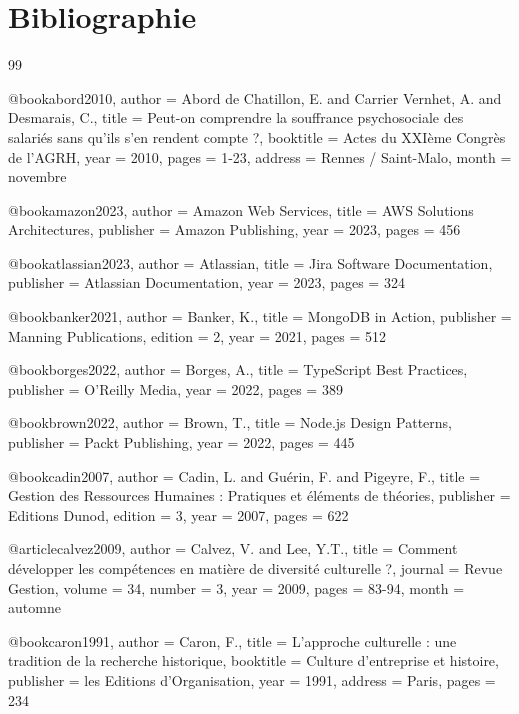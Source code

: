 \chapter*{Bibliographie}

\begin{thebibliography}{99}

@book{abord2010,
  author = {Abord de Chatillon, E. and Carrier Vernhet, A. and Desmarais, C.},
  title = {Peut-on comprendre la souffrance psychosociale des salariés sans qu'ils s'en rendent compte ?},
  booktitle = {Actes du XXIème Congrès de l'AGRH},
  year = {2010},
  pages = {1-23},
  address = {Rennes / Saint-Malo},
  month = {novembre}
}

@book{amazon2023,
  author = {Amazon Web Services},
  title = {AWS Solutions Architectures},
  publisher = {Amazon Publishing},
  year = {2023},
  pages = {456}
}

@book{atlassian2023,
  author = {Atlassian},
  title = {Jira Software Documentation},
  publisher = {Atlassian Documentation},
  year = {2023},
  pages = {324}
}

@book{banker2021,
  author = {Banker, K.},
  title = {MongoDB in Action},
  publisher = {Manning Publications},
  edition = {2},
  year = {2021},
  pages = {512}
}

@book{borges2022,
  author = {Borges, A.},
  title = {TypeScript Best Practices},
  publisher = {O'Reilly Media},
  year = {2022},
  pages = {389}
}

@book{brown2022,
  author = {Brown, T.},
  title = {Node.js Design Patterns},
  publisher = {Packt Publishing},
  year = {2022},
  pages = {445}
}

@book{cadin2007,
  author = {Cadin, L. and Guérin, F. and Pigeyre, F.},
  title = {Gestion des Ressources Humaines : Pratiques et éléments de théories},
  publisher = {Editions Dunod},
  edition = {3},
  year = {2007},
  pages = {622}
}

@article{calvez2009,
  author = {Calvez, V. and Lee, Y.T.},
  title = {Comment développer les compétences en matière de diversité culturelle ?},
  journal = {Revue Gestion},
  volume = {34},
  number = {3},
  year = {2009},
  pages = {83-94},
  month = {automne}
}

@book{caron1991,
  author = {Caron, F.},
  title = {L'approche culturelle : une tradition de la recherche historique},
  booktitle = {Culture d'entreprise et histoire},
  publisher = {les Editions d'Organisation},
  year = {1991},
  address = {Paris},
  pages = {234}
}


\end{thebibliography}
